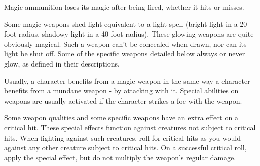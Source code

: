 Magic ammunition loses its magic after being fired, whether it hits or misses.

 Some magic weapons shed light equivalent to a light spell (bright light in a 20-foot radius, shadowy light in a 40-foot radius). These glowing weapons are quite obviously magical. Such a weapon can't be concealed when drawn, nor can its light be shut off. Some of the specific weapons detailed below always or never glow, as defined in their descriptions.

 Usually, a character benefits from a magic weapon in the same way a character benefits from a mundane weapon - by attacking with it. Special abilities on weapons are usually activated if the character strikes a foe with the weapon.

 Some weapon qualities and some specific weapons have an extra effect on a critical hit. These special effects function against creatures not subject to critical hits. When fighting against such creatures, roll for critical hits as you would against any other creature subject to critical hits. On a successful critical roll, apply the special effect, but do not multiply the weapon's regular damage.

